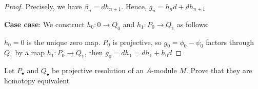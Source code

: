 \begin{proof}
	Precisely, we have $\beta_n = d h_{n+1}$. Hence, $g_n = h_n d + d h_{n+1}$
	
	\textbf{Case case}: We construct $h_0: 0 \to Q_0$ and $h_1: P_0 \to Q_1$ as follows:
		
	\begin{center}
	\end{center}
	
	$h_0 = 0$ is the unique zero map. $P_0$ is projective, so $g_0 = \phi_0 - \psi_0$ factors through $Q_1$ by a map $h_1: P_0 \to Q_1$, then $g_0 = d h_1 = d h_1 + h_0 d$
\end{proof}

\begin{problem}[problem 2]
	Let $P_\bullet$ and $Q_\bullet$ be projective resolution of an $A$-module $M$. Prove that they are homotopy equivalent
\end{problem}

